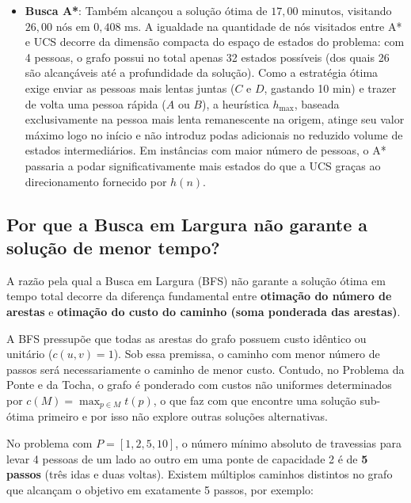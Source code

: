 \documentclass[12pt,a4paper]{article}
\begin{document}
\begin{itemize}[leftmargin=1.5cm]
    \item \textbf{Busca A*}: Também alcançou a solução ótima de 
    $17{,}00\text{ minutos}$, visitando $26{,}00\text{ nós}$ em $0{,}408\text{ ms}$. 
    A igualdade na quantidade de nós visitados entre A* e UCS decorre da dimensão 
    compacta do espaço de estados do problema: com 4 pessoas, o grafo possui no 
    total apenas 32 estados possíveis (dos quais 26 são alcançáveis até a profundidade 
    da solução). Como a estratégia ótima exige enviar as pessoas mais lentas juntas 
    ($C$ e $D$, gastando 10 min) e trazer de volta uma pessoa rápida ($A$ ou $B$), a 
    heurística $h_{\max}$, baseada exclusivamente na pessoa mais lenta remanescente na 
    origem, atinge seu valor máximo logo no início e não introduz podas adicionais no 
    reduzido volume de estados intermediários. Em instâncias com maior número de pessoas, 
    o A* passaria a podar significativamente mais estados do que a UCS graças ao 
    direcionamento fornecido por $h(n)$.
\end{itemize}

\subsection{Por que a Busca em Largura não garante a solução de menor tempo?}
\label{subsec:por-que-bfs-nao-garante-otimo}
%

A razão pela qual a Busca em Largura (BFS) não garante a solução ótima em tempo total 
decorre da diferença fundamental entre \textbf{otimação do número de arestas} e 
\textbf{otimação do custo do caminho (soma ponderada das arestas)}.

A BFS pressupõe que todas as arestas do grafo possuem custo idêntico ou unitário 
($c(u, v) = 1$). Sob essa premissa, o caminho com menor número de passos será
necessariamente o caminho de menor custo. Contudo, no Problema da Ponte e da Tocha, o 
grafo é ponderado com custos não uniformes determinados por $c(M) = \max_{p \in M} t(p)$,
o que faz com que encontre uma solução sub-ótima primeiro e por isso não explore outras
soluções alternativas.

No problema com $P = [1, 2, 5, 10]$, o número mínimo absoluto de travessias para levar 4 pessoas de um lado ao outro em uma ponte de capacidade 2 é de \textbf{5 passos} (três idas e duas voltas). Existem múltiplos caminhos distintos no grafo que alcançam o objetivo em exatamente 5 passos, por exemplo:
\end{document}

